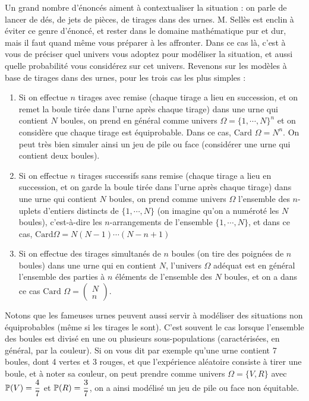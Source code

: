 \documentclass[12pt,a4paper]{report}
\begin{document}
\begin{remarque}{}
Un grand nombre d'énoncés aiment à contextualiser la situation : on parle de lancer de dés, de jets de pièces, de tirages dans des urnes. M. Sellès est enclin à 
éviter ce genre d'énoncé, et rester dans le domaine mathématique pur et dur, mais il faut quand même vous préparer à les affronter. Dans ce cas là, c'est à vous de 
préciser quel univers vous adoptez pour modéliser la situation, et aussi quelle probabilité vous considérez sur cet univers. Revenons sur les modèles à base de 
tirages dans des urnes, pour les trois cas les plus simples :
\begin{enumerate}
	\item Si on effectue $n$ tirages avec remise (chaque tirage a lieu en succession, et on remet la boule tirée dans l'urne après chaque tirage) dans une urne qui 
	contient $N$ boules, on prend en général comme univers $\Omega = \{1,\cdots,N\}^n$ et on considère que chaque tirage est équiprobable. Dans ce cas, 
	$\text{Card } \Omega = N^n$. On peut très bien simuler ainsi un jeu de pile ou face (considérer une urne qui contient deux boules).
	\item Si on effectue $n$ tirages successifs sans remise (chaque tirage a lieu en succession, et on garde la boule tirée dans l'urne après chaque tirage) dans une 
	urne qui contient $N$ boules, on prend comme univers $\Omega$ l'ensemble des $n$-uplets d'entiers distincts de $\{1,\cdots,N\}$ (on imagine qu'on a numéroté les 
	$N$ boules), c'est-à-dire les $n$-arrangements de l'ensemble $\{1,\cdots,N\}$, et dans ce cas, $\text{Card}  \Omega = N(N-1) \cdots (N-n+1)$
	\item Si on effectue des tirages simultanés de $n$ boules (on tire des poignées de $n$ boules) dans une urne qui en contient $N$, l'univers $\Omega$ adéquat est 
	en général l'ensemble des parties à $n$ éléments de l'ensemble des $N$ boules, et on a dans ce cas $\text{Card } \Omega = \begin{pmatrix} N \\ n \end{pmatrix}$.
\end{enumerate}
Notons que les fameuses urnes peuvent aussi servir à modéliser des situations non équiprobables (même si les tirages le sont). C'est souvent le cas lorsque l'ensemble 
des boules est divisé en une ou plusieurs sous-populations (caractérisées, en général, par la couleur). Si on vous dit par exemple qu'une urne contient 7 boules, dont 
4 vertes et 3 rouges, et que l'expérience aléatoire consiste à tirer une boule, et à noter sa couleur, on peut prendre comme univers $\Omega = \{V,R\}$ avec $\mathbb{P}(V) = \dfrac{4}{7}$ et $\mathbb{P}(R) = \dfrac{3}{7}$, on a ainsi modélisé un jeu de pile ou face non équitable.
\end{remarque}
\end{document}
